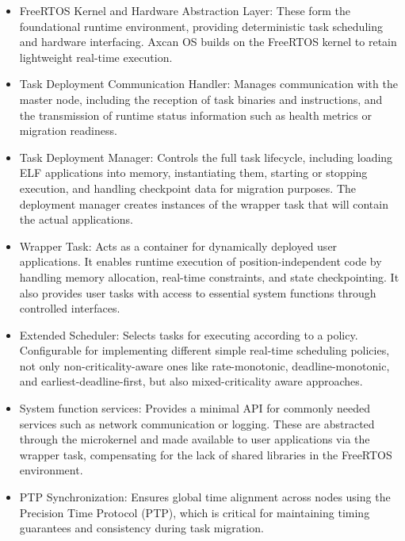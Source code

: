 \begin{itemize}
	\item FreeRTOS Kernel and Hardware Abstraction Layer: These form the foundational runtime environment, providing deterministic task scheduling and hardware interfacing. Axcan OS builds on the FreeRTOS kernel to retain lightweight real-time execution.
	\item Task Deployment Communication Handler: Manages communication with the master node, including the reception of task binaries and instructions, and the transmission of runtime status information such as health metrics or migration readiness.
	\item Task Deployment Manager: Controls the full task lifecycle, including loading ELF applications into memory, instantiating them, starting or stopping execution, and handling checkpoint data for migration purposes. The deployment manager creates instances of the wrapper task that will contain the actual applications.
	\item Wrapper Task: Acts as a container for dynamically deployed user applications. It enables runtime execution of position-independent code by handling memory allocation, real-time constraints, and state checkpointing. It also provides user tasks with access to essential system functions through controlled interfaces.
	\item Extended Scheduler: Selects tasks for executing according to a policy. Configurable for implementing different simple real-time scheduling policies, not only non-criticality-aware ones like rate-monotonic, deadline-monotonic, and earliest-deadline-first, but also mixed-criticality aware approaches.
	\item System function services: Provides a minimal API for commonly needed services such as network communication or logging. These are abstracted through the microkernel and made available to user applications via the wrapper task, compensating for the lack of shared libraries in the FreeRTOS environment. 
	\item PTP Synchronization: Ensures global time alignment across nodes using the Precision Time Protocol (PTP), which is critical for maintaining timing guarantees and consistency during task migration.
\end{itemize}

